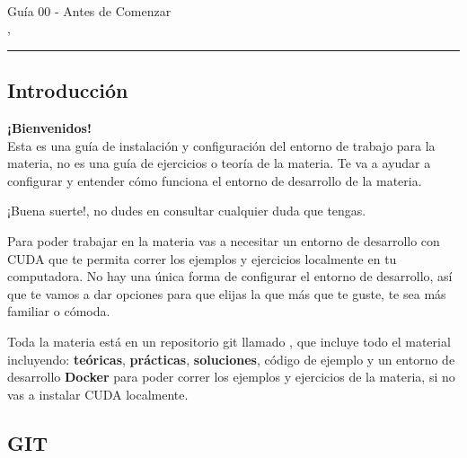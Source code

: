 



\begin{center}
  \LARGE\textbf{\coursename} \\
  \Large{Guía 00 - Antes de Comenzar} \\
  \normalsize{\currentsemester, \currentyear} \\
  \vspace{1em}
  \hrule
\end{center}

\vspace{1em}

\setcounter{section}{1}

\subsection{Introducción}
\label{sec:set_up}

\begin{tcolorbox}[colback=mint,colframe=mint!75!black,arc=0pt,outer arc=0pt]
  \textbf{¡Bienvenidos!} \\

  Esta es una guía de instalación y configuración del entorno de trabajo para la materia, no es una guía de ejercicios o
  teoría de la materia. Te va a ayudar a configurar y entender cómo funciona el entorno de desarrollo de la materia.

  ¡Buena suerte!, no dudes en consultar cualquier duda que tengas.
\end{tcolorbox}

Para poder trabajar en la materia vas a necesitar un entorno de desarrollo con CUDA que te permita correr los ejemplos y
ejercicios localmente en tu computadora. No hay una única forma de configurar el entorno de desarrollo, así que te vamos
a dar opciones para que elijas la que más que te guste, te sea más familiar o cómoda.

Toda la materia está en un repositorio git llamado
\href{https://github.com/felixcuello/up-programacion-con-gpu}{\coursename}, que incluye todo el material incluyendo:
\textbf{teóricas}, \textbf{prácticas}, \textbf{soluciones}, código de ejemplo y un entorno de desarrollo \textbf{Docker}
para poder correr los ejemplos y ejercicios de la materia, si no vas a instalar CUDA localmente.

\subsection{GIT}

